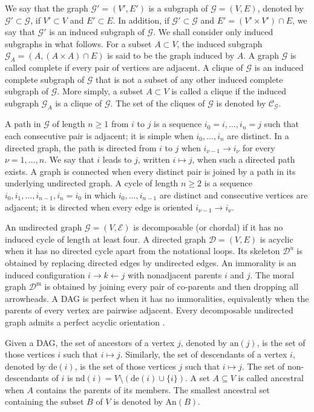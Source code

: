 \documentclass[12pt]{article}
\newcommand{\D}{\mathcal{D}}
\newcommand{\G}{\mathcal{G}}
\theoremstyle{plain}
\theoremstyle{definition}
\theoremstyle{remark}
\begin{document}
\indent We say that the graph $\G'=(V', E')$ is a subgraph of  $\G=(V, E)$,  denoted by  $\G'\subset \G$,  if  $V'\subset V$  and  $ E'\subset  E$. In addition, if  $\G'\subset \G$  and  $ E'=(V'\times V')\cap E$, we say that $\G'$ is an {induced}  subgraph of  $\G$. We shall consider only induced subgraphs in what follows. For a subset  $A\subset V$, the induced subgraph  $\G_A=(A, (A\times A)\cap E)$ is said to be the graph {induced} by $A$. A graph  $\G$  is called {complete} if every pair of vertices are adjacent. A  clique  of  $\G$  is an induced complete subgraph  of  $\G$ that is not a subset of any other induced complete subgraph of  $\G$. More simply,  a subset  $A\subset V$  is  called a clique if the induced subgraph  $\G_A$  is a clique of $\G$. The set of the cliques of $\G$ is denoted by $\mathscr{C}_{\G}$.


\indent A path in $\G$ of length $n\geq1$ from $i$ to $j$ is a sequence
$i_0=i,\ldots,i_n=j$ such that each consecutive pair is adjacent; it is
simple when $i_0,\ldots,i_n$ are distinct.  In a directed graph, the path is
directed from $i$ to $j$ when $i_{\nu-1}\to i_\nu$ for every
$\nu=1,\ldots,n$.  We say that $i$ leads to $j$, written
$i\longmapsto j$, when such a directed path exists.  A graph is connected
when every distinct pair is joined by a path in its underlying undirected
graph.  A cycle of length $n\geq2$ is a sequence
$i_0,i_1,\ldots,i_{n-1},i_n=i_0$ in which
$i_0,\ldots,i_{n-1}$ are distinct and consecutive vertices are adjacent; it
is directed when every edge is oriented $i_{\nu-1}\to i_\nu$.

\indent An undirected graph $\G=(V,\mathscr E)$ is decomposable (or
chordal) if it has no induced cycle of length at least four.  A directed
graph $\D=(V,E)$ is acyclic when it has no directed cycle apart from the
notational loops.  Its skeleton $\D^u$ is obtained by replacing directed
edges by undirected edges.  An immorality is an induced configuration
$i\to k\leftarrow j$ with nonadjacent parents $i$ and $j$.  The moral graph
$\D^{\mathrm m}$ is obtained by joining every pair of co-parents and then
dropping all arrowheads.  A DAG is perfect when it has no immoralities,
equivalently when the parents of every vertex are pairwise adjacent.  Every
decomposable undirected graph admits a perfect acyclic orientation
\cite{lauritzen96*}.

\indent Given a DAG, the set of ancestors of a vertex $j$, denoted by $\mathrm{an}(j)$, is the set of those vertices $i$  such that $i\longmapsto j$. Similarly, the set of descendants of a vertex $i$, denoted by  $\mathrm{de}(i)$, is the set of  those  vertices  $j$  such that  $i\longmapsto j$.  The   set of non-descendants of  $i$  is  $\mathrm{nd}(i)=V\setminus\left(\mathrm{de}(i)\cup \{i\}\right)$. A set  $A\subseteq V$  is called ancestral when $A$  contains the parents of its members. The smallest ancestral set containing the subset $B$ of $V$ is denoted by $\mathrm{An}(B)$. 
\end{document}
